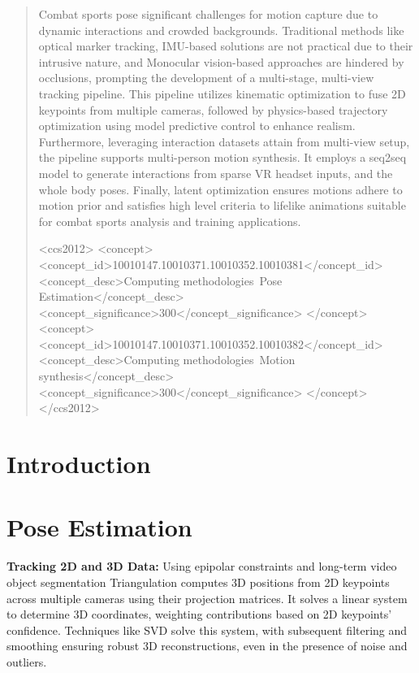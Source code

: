 \begin{abstract}
   Combat sports pose significant challenges for motion capture due to dynamic interactions and crowded backgrounds. Traditional methods like optical marker tracking, IMU-based solutions are not practical due to their intrusive nature, and Monocular vision-based approaches are hindered by occlusions, prompting the development of a multi-stage, multi-view tracking pipeline. This pipeline utilizes kinematic optimization to fuse 2D keypoints from multiple cameras, followed by physics-based trajectory optimization using model predictive control to enhance realism.
   Furthermore, leveraging interaction datasets attain from multi-view setup, the pipeline supports multi-person motion synthesis. It employs a seq2seq model to generate interactions from sparse VR headset inputs, and the whole body poses. Finally, latent optimization ensures motions adhere to motion prior and satisfies high level criteria to lifelike animations suitable for combat sports analysis and training applications.

\begin{CCSXML}
<ccs2012>
<concept>
<concept_id>10010147.10010371.10010352.10010381</concept_id>
<concept_desc>Computing methodologies~Pose Estimation</concept_desc>
<concept_significance>300</concept_significance>
</concept>
<concept>
<concept_id>10010147.10010371.10010352.10010382</concept_id>
<concept_desc>Computing methodologies~Motion synthesis</concept_desc>
<concept_significance>300</concept_significance>
</concept>
</ccs2012>
\end{CCSXML}



\printccsdesc   
\end{abstract}  
\section{Introduction}


\section{Pose Estimation}

\textbf{Tracking 2D and 3D Data:} Using epipolar constraints and long-term video object segmentation Triangulation computes 3D positions from 2D keypoints across multiple cameras using their projection matrices. It solves a linear system to determine 3D coordinates, weighting contributions based on 2D keypoints’ confidence. Techniques like SVD solve this system, with subsequent filtering and smoothing ensuring robust 3D reconstructions, even in the presence of noise and outliers.


